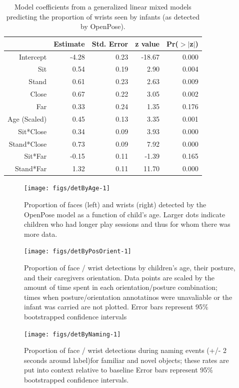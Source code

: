 \documentclass[english,man]{apa6}
\begin{document}
\begin{table}[ht]
\centering
\begin{tabular}{rrrrr}
  \hline
 & Estimate & Std. Error & z value & Pr($>$$|$z$|$) \\
  \hline
Intercept & -4.28 & 0.23 & -18.67 & 0.000 \\
  Sit & 0.54 & 0.19 & 2.90 & 0.004 \\
  Stand & 0.61 & 0.23 & 2.63 & 0.009 \\
  Close & 0.67 & 0.22 & 3.05 & 0.002 \\
  Far & 0.33 & 0.24 & 1.35 & 0.176 \\
  Age (Scaled) & 0.45 & 0.13 & 3.35 & 0.001 \\
  Sit*Close & 0.34 & 0.09 & 3.93 & 0.000 \\
  Stand*Close & 0.73 & 0.09 & 7.92 & 0.000 \\
  Sit*Far & -0.15 & 0.11 & -1.39 & 0.165 \\
  Stand*Far & 1.32 & 0.11 & 11.70 & 0.000 \\
   \hline
\end{tabular}
\caption{Model coefficients from a generalized linear mixed models predicting the proportion of wrists seen by infants (as detected by OpenPose).}
\end{table}

\begin{figure}[H]
\texttt{[image: figs/detByAge-1]} \caption{Proportion of faces (left) and wrists (right) detected by the OpenPose model as a function of child's age. Larger dots indicate children who had longer play sessions and thus for whom there was more data.}\label{fig:detByAge}
\end{figure}

\begin{figure}[H]

{\centering \texttt{[image: figs/detByPosOrient-1]} 

}

\caption{Proportion of face / wrist detections by children's age, their posture, and their caregivers orientation. Data points are scaled by the amount of time spent in each orientation/posture combination; times when posture/orientation annotatinos were unavaliable or the infant was carried are not plotted. Error bars represent 95\% bootstrapped confidence intervals}\label{fig:detByPosOrient}
\end{figure}

\begin{figure}[H]

{\centering \texttt{[image: figs/detByNaming-1]} 

}

\caption{Proportion of face / wrist detections during naming events (+/- 2 seconds around label)for familiar and novel objects; these rates are put into context relative to baseline Error bars represent 95\% bootstrapped confidence intervals.}\label{fig:detByNaming}
\end{figure}
\end{document}
